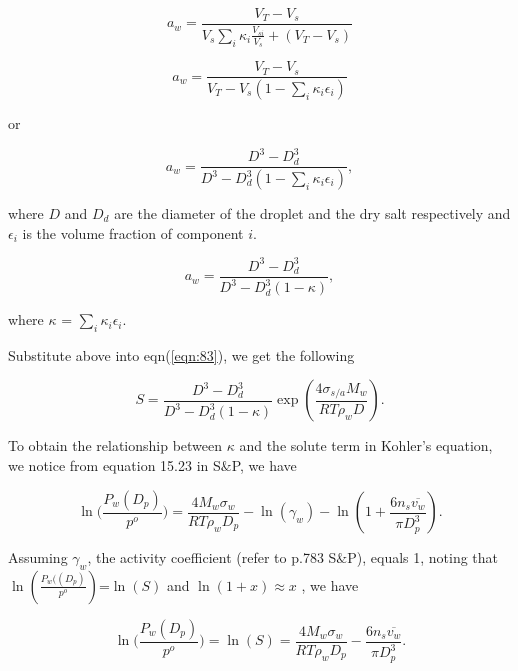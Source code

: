 \documentclass[12pt]{article}
\begin{document}
\begin{itemize}
\begin{equation}
a_{w}= \frac {V_{T}-V_{s} }{V_{s} \sum_{i} \kappa_{i} \frac{V_{si}}{V_{s}} +(V_{T}-V_{s})}
\end{equation}


\begin{equation}
a_{w}= \frac {V_{T}-V_{s} }{V_{T} - V_{s} (1- \sum_{i} \kappa_{i} \epsilon_{i})}
\end{equation}

 or
 
 \begin{equation}
a_{w}= \frac {D^{3}-D_{d}^{3} }{D^{3}-D_{d}^{3} (1- \sum_{i} \kappa_{i} \epsilon_{i})},
\end{equation}

where 
$D$ and $D_{d}$ are the diameter of the droplet and the dry salt respectively and $\epsilon_{i}$ is the volume fraction of component $i$.

\begin{equation}
a_{w}= \frac {D^{3}-D_{d}^{3} }{D^{3}-D_{d}^{3} (1- \kappa)},
\end{equation}

where $\kappa$ = $\sum_{i} \kappa_{i} \epsilon_{i}$.

Substitute above into eqn(\ref{eqn:83}), we get the following

\begin{equation}\label{eqn:99}
S=\frac {D^{3}-D_{d}^{3} }{D^{3}-D_{d}^{3} (1- \kappa)}\exp (\frac{4 \sigma_{s/a} M_{w}} {RT\rho_wD}).
\end{equation}

To obtain the relationship between $\kappa$ and the solute term in Kohler's equation, we notice from equation 15.23 in S$\&$P, we have 

\begin{equation}
\ln \Big(\frac{P_{w}(D_{p})}{p^{o}} \Big)=\frac{4M_{w}\sigma_{w}}{RT\rho_{w}D_{p}}-\ln(\gamma_{w})-\ln(1+\frac{6 n_{s} {\overline{v_{w} } } } {\pi D_{p}^{3} } ).
\end{equation}

Assuming $\gamma_{w}$, the activity coefficient (refer to p.783 S$\&$P), equals 1, noting that $\ln(\frac{P_{w}((D_{p})}{p^{o}})$=$\ln(S)$  and $\ln(1+x)$$\approx x$  , we have

\begin{equation}
\ln \Big(\frac{P_{w}(D_{p})}{p^{o}} \Big)=\ln(S)=\frac{4M_{w}\sigma_{w}}{RT\rho_{w}D_{p}}-\frac{6 n_{s} {\overline{v_{w} } } } {\pi D_{p}^{3} }.  
\end{equation}


\end{itemize}
\end{document}
